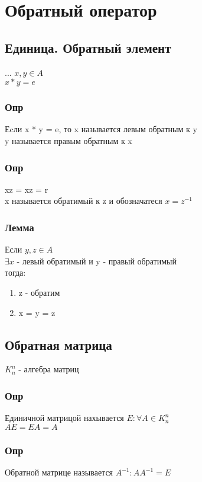 \documentclass{article}
\begin{document}
\section{Обратный оператор}
\subsection{Единица. Обратный элемент}
...
$x, y \in A$ \\
$x * y = e$

\subsubsection{Опр}
Еcли x *  y = e, то x называется левым обратным к y \\
y называется правым обратным к x

\subsubsection{Опр}
xz = xz = r \\
x называется обратимый к z и обозначатеся $x = z^{-1}$

\subsubsection{Лемма}
Если $y, z \in A$ \\
$\exists x$  - левый обратимый и y - правый обратимый \\
тогда: \\
\begin{enumerate}
\item z - обратим
\item x = y = z
\end{enumerate}


\subsection{Обратная матрица}

$K^n_n$ - алгебра матриц
\subsubsection{Опр}
Единичной матрицой нахывается $E: \forall A \in K^n_n$ \\
$AE = EA = A$

\subsubsection{Опр}
Обратной матрице называется $A^{-1}: AA^{-1} = E$
\end{document}
